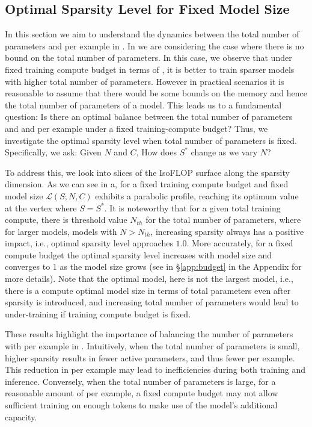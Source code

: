 \subsection{Optimal Sparsity Level for Fixed Model Size}
\label{sec:fix_params_vary_sparsity}
In this section we aim to understand the dynamics between the total number of parameters and \flops per example in \moes. 
In  we are considering the case where there is no bound on the total number of parameters. In this case, we observe that under fixed training  compute budget in terms of \flops, it is better to train  sparser models with higher total number of parameters. However in practical scenarios it is reasonable to assume that there would be some bounds on the memory and hence the total number of parameters of a model. 
This leads us to a fundamental question: Is there an optimal balance between the total number of parameters and and \flops per example under a fixed training-compute budget? 
Thus, we investigate the optimal sparsity level when total number of parameters is fixed.
Specifically, we ask: Given \(N\) and \(C\), How does \(S^*\) change as we vary \(N\)?

To address this, we look into slices of the IsoFLOP surface along the sparsity dimension. As we can see in a, for a fixed training compute budget and fixed model size $\mathcal{L}(S; N,C)$ exhibits a parabolic profile, reaching its optimum value at the vertex where $S = S^*$. It is noteworthy that for a given total training compute, there is threshold value $N_{th}$ for the total number of parameters, where for larger models, models with \( N > N_{th} \), increasing sparsity always has a positive impact, i.e., optimal sparsity level approaches $1.0$. More accurately, for a fixed compute budget the optimal sparsity level increases with model size and converges to $1$ as the model size grows (see  in \S\ref{app:budget} in the Appendix for more details).
Note that the optimal model, here is not the largest model, i.e., there is a compute optimal model size in terms of total parameters even after sparsity is introduced, and increasing total number of parameters would lead to under-training if training compute budget is fixed.

These results highlight the importance of balancing the number of parameters with \flops per example in \moes. Intuitively, when the total number of parameters is small, higher sparsity results in fewer active parameters, and thus fewer \flops per example. This reduction in \flops per example may lead to inefficiencies during both training and inference. Conversely, when the total number of parameters is large, for a reasonable amount of \flops per example, a fixed compute budget may not allow sufficient training on enough tokens to make use of the model's additional capacity.
